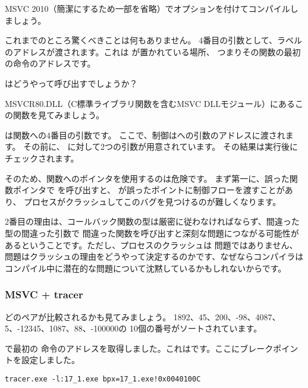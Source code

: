 MSVC 2010（簡潔にするため一部を省略）で\TT{\Ox}オプションを付けてコンパイルしましょう。



これまでのところ驚くべきことは何もありません。 
4番目の引数として、ラベルのアドレスが渡されます。これは \comp が置かれている場所、
つまりその関数の最初の命令のアドレスです。

\qsort はどうやって呼び出すでしょうか？


MSVCR80.DLL（C標準ライブラリ関数を含むMSVC DLLモジュール）にあるこの関数を見てみましょう。



は関数への4番目の引数です。 
ここで、制御はへの引数のアドレスに渡されます。
その前に、 \comp に対して2つの引数が用意されています。 その結果は実行後にチェックされます。

そのため、関数へのポインタを使用するのは危険です。 
まず第一に、誤った関数ポインタで \qsort を呼び出すと、 \qsort が誤ったポイントに制御フローを渡すことがあり、
プロセスがクラッシュしてこのバグを見つけるのが難しくなります。

2番目の理由は、コールバック関数の型は厳密に従わなければならず、間違った型の間違った引数で
間違った関数を呼び出すと深刻な問題につながる可能性があるということです。ただし、プロセスのクラッシュは
問題ではありません、問題はクラッシュの理由をどうやって決定するのかです、なぜならコンパイラは
コンパイル中に潜在的な問題について沈黙しているかもしれないからです。



\subsubsection{MSVC + tracer}

どのペアが比較されるかも見てみましょう。 
1892、45、200、-98、4087、5、-12345、1087、88、-100000の
10個の番号がソートされています。

\comp で最初の \CMP 命令のアドレスを取得しました。これはです。ここにブレークポイントを設定しました。

\begin{lstlisting}
tracer.exe -l:17_1.exe bpx=17_1.exe!0x0040100C
\end{lstlisting}

